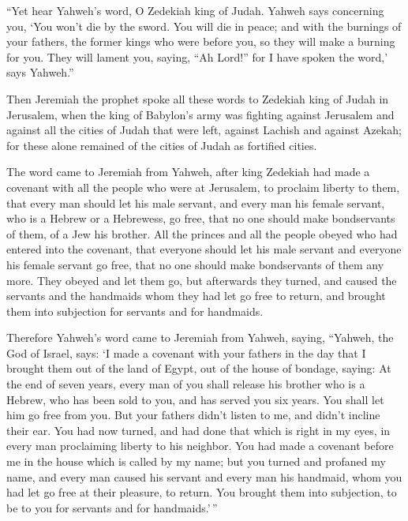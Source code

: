  ``Yet hear Yahweh's word, O Zedekiah king of Judah.
Yahweh says concerning you, `You won't die by the sword. 
You will die in peace; and with the burnings of your fathers, the former
kings who were before you, so they will make a burning for you. They
will lament you, saying, ``Ah Lord!'' for I have spoken the word,' says
Yahweh.''

 Then Jeremiah the prophet spoke all these words to
Zedekiah king of Judah in Jerusalem,  when the king of
Babylon's army was fighting against Jerusalem and against all the cities
of Judah that were left, against Lachish and against Azekah; for these
alone remained of the cities of Judah as fortified cities.

 The word came to Jeremiah from Yahweh, after king
Zedekiah had made a covenant with all the people who were at Jerusalem,
to proclaim liberty to them,  that every man should let
his male servant, and every man his female servant, who is a Hebrew or a
Hebrewess, go free, that no one should make bondservants of them, of a
Jew his brother.  All the princes and all the people
obeyed who had entered into the covenant, that everyone should let his
male servant and everyone his female servant go free, that no one should
make bondservants of them any more. They obeyed and let them go,
 but afterwards they turned, and caused the servants and
the handmaids whom they had let go free to return, and brought them into
subjection for servants and for handmaids.

 Therefore Yahweh's word came to Jeremiah from Yahweh,
saying,  ``Yahweh, the God of Israel, says: `I made a
covenant with your fathers in the day that I brought them out of the
land of Egypt, out of the house of bondage, saying:  At
the end of seven years, every man of you shall release his brother who
is a Hebrew, who has been sold to you, and has served you six years. You
shall let him go free from you. But your fathers didn't listen to me,
and didn't incline their ear.  You had now turned, and
had done that which is right in my eyes, in every man proclaiming
liberty to his neighbor. You had made a covenant before me in the house
which is called by my name;  but you turned and profaned
my name, and every man caused his servant and every man his handmaid,
whom you had let go free at their pleasure, to return. You brought them
into subjection, to be to you for servants and for handmaids.'\,''

